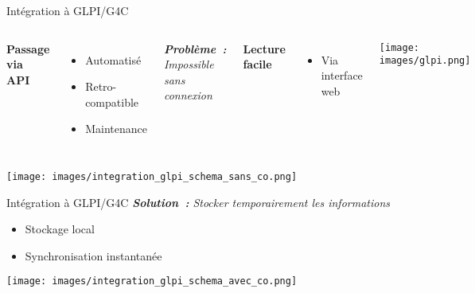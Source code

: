 \begin{frame}{Intégration à GLPI/G4C}
    \begin{columns}
            \textbf{Passage via API}
            \begin{itemize}
                \item Automatisé
                \item Retro-compatible
                \item Maintenance
            \end{itemize}
            \vspace*{0.3cm}
            \emph{\textbf{Problème~:} Impossible sans connexion}

        \textbf{Lecture facile}
        \begin{itemize}
            \item Via interface web
        \end{itemize}
        \vspace*{-0.7cm}
        \begin{center}
            \hspace*{-0.4cm}
            \texttt{[image: images/glpi.png]}
        \end{center}

    \end{columns}
    \vspace*{-1.2cm}
    \begin{center}
        \texttt{[image: images/integration\_glpi\_schema\_sans\_co.png]}
    \end{center}
\end{frame}
\begin{frame}{Intégration à GLPI/G4C}
    \emph{\textbf{Solution~:} Stocker temporairement les informations}
    \begin{itemize}
        \item Stockage local
        \item Synchronisation instantanée
    \end{itemize}
    \begin{center}
        \vspace*{-0.2cm}
        \texttt{[image: images/integration\_glpi\_schema\_avec\_co.png]}
    \end{center}
\end{frame}


